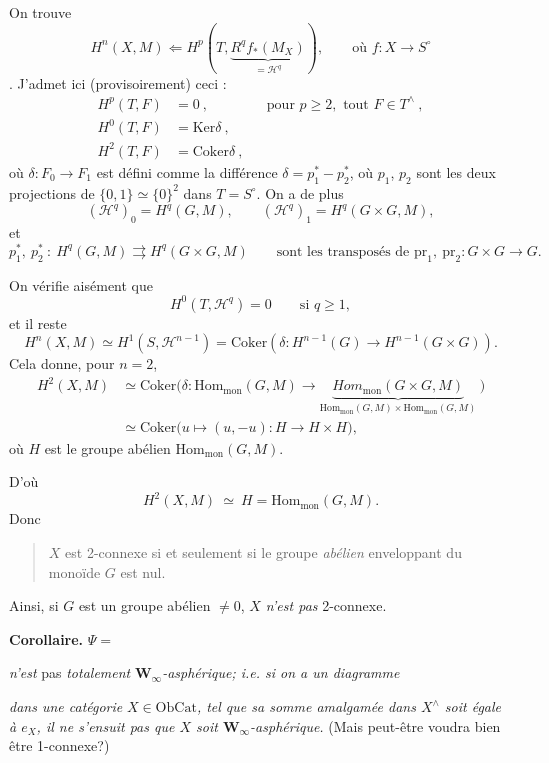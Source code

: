 \documentclass[11pt]{article}
\newcommand{\printedpage}[1]{\marginpar{\footnotesize p.~#1}}
\newcommand{\msp}[1]{\marginpar{\footnotesize [#1]}}
\newcommand{\Hom}{\mathrm{Hom}}
\newcommand{\Ob}{\mathrm{Ob}}
\newcommand{\Cat}{\mathrm{Cat}}
\newcommand{\pr}{\mathrm{pr}}
\newcommand{\Ker}{\mathrm{Ker}}
\newcommand{\Coker}{\mathrm{Coker}}
\newcommand{\mon}{\mathrm{mon}}
\begin{document}
On trouve 
\[
H^n(X,M) \Longleftarrow H^p(T, \underbrace{R^q f_*(M_X)}_{= \mathcal{H}^q}), \qquad \text{où } f : X \longrightarrow S^\circ
\]
. J'admet ici (provisoirement) ceci : %
\[
\begin{aligned}
H^p(T,F) &= 0 \ , &&\text{pour } p\geq 2, \text{ tout } F\in T^\wedge \ ,\\
H^0(T,F) &= \Ker\delta \ , &&\\
H^2(T,F) &= \Coker\delta \ , && %
\end{aligned}
\]
\printedpage{3}
où $\delta : F_0 \longrightarrow F_1$ est défini comme la différence $\delta = p_1^* - p_2^*$, où $p_1$, $p_2$ sont les deux projections de $\{0,1\}\simeq\{0\}^2$ dans $T = S^\circ$. On a de plus
\[
(\mathcal{H}^q)_0 = H^q(G,M), \qquad (\mathcal{H}^q)_1 = H^q(G\times G, M),
\]
et
\[
p_1^*,\ p_2^*\ :\ H^q(G,M) \rightrightarrows H^q(G{\times}G, M) \qquad \text{sont les transposés de } \pr_1,\ \pr_2 : G\times G\longrightarrow G.
\]

\msp{page 4}
On vérifie aisément que
\[
H^0(T,\mathcal{H}^q) = 0 \qquad \text{si } q\geq 1,
\]
et il reste
\[
H^n(X,M) \simeq H^1(S,\mathcal{H}^{n-1}) = \Coker(\delta : H^{n-1}(G) \longrightarrow H^{n-1}(G\times G)). %
\]
Cela donne, pour $n = 2$,
\[
\begin{aligned}
H^2(X,M) &\simeq \Coker\Big(\delta : \Hom_\mon(G,M) \longrightarrow \underbrace{\mathit{Hom}_\mon(G\times G, M)}_{\Hom_\mon(G,M)\times\Hom_\mon(G,M)} \ \Big)\\
&\simeq \Coker\Big(u\longmapsto (u,-u) : H \longrightarrow H\times H\Big),
\end{aligned}
\]
où $H$ est le groupe abélien $\Hom_\mon(G,M)$.

D'où
\[
H^2(X,M) \ \simeq\ H = \Hom_\mon(G,M).
\]
Donc
\begin{quote}
$X$ est 2-connexe si et seulement si le groupe \textit{abélien} enveloppant du monoïde $G$ est nul.
\end{quote}

Ainsi, si $G$ est un groupe abélien $\neq 0$, $X$ \textit{n'est pas} 2-connexe.

\textbf{Corollaire.} $\Psi = {}$
\textit{n'est} pas \textit{totalement} $\mathbf{W}_\infty$\textit{-asphérique; i.e. si on a un diagramme} 
\textit{dans une catégorie} $X\in\Ob\Cat$\textit{, tel que sa somme amalgamée dans $X^\wedge$ soit égale à $e_X$, il ne s'ensuit pas que $X$ soit $\mathbf{W}_\infty$-asphérique.} (Mais peut-être voudra bien être 1-connexe?)
\end{document}
